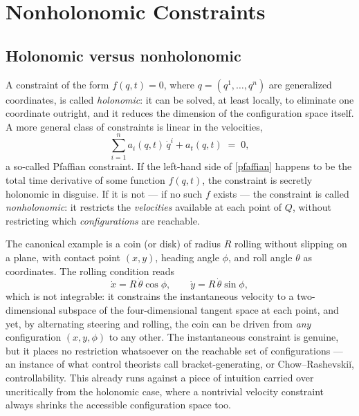 \chapter{Nonholonomic Constraints}
\label{nh}

\section{Holonomic versus nonholonomic}

A constraint of the form $f(q,t)=0$, where $q=(q^1,\dots,q^n)$ are
generalized coordinates, is called \emph{holonomic}: it can be
solved, at least locally, to eliminate one coordinate outright, and
it reduces the dimension of the configuration space itself. A more
general class of constraints is linear in the velocities,
\begin{equation}
  \sum_{i=1}^n a_i(q,t)\,\dot q^i + a_t(q,t) \;=\;0,
  \label{pfaffian}
\end{equation}
a so-called Pfaffian constraint. If the left-hand side of
\eqref{pfaffian} happens to be the total time derivative of some
function $f(q,t)$, the constraint is secretly holonomic in disguise.
If it is not --- if no such $f$ exists --- the constraint is called
\emph{nonholonomic}: it restricts the \emph{velocities} available at
each point of $Q$, without restricting which \emph{configurations}
are reachable.

The canonical example is a coin (or disk) of radius $R$ rolling
without slipping on a plane, with contact point $(x,y)$, heading
angle $\phi$, and roll angle $\theta$ as coordinates. The
rolling condition reads
\begin{equation}
  \dot x = R\,\dot\theta\cos\phi ,\qquad
  \dot y = R\,\dot\theta\sin\phi ,
  \label{eq:rolling-coin}
\end{equation}
which is not integrable: it constrains the instantaneous velocity to
a two-dimensional subspace of the four-dimensional tangent space at
each point, and yet, by alternating steering and rolling, the coin
can be driven from \emph{any} configuration $(x,y,\phi)$ to any
other. The instantaneous constraint is genuine, but it places no
restriction whatsoever on the reachable set of configurations --- an
instance of what control theorists call bracket-generating, or
Chow--Rashevski\u{i}, controllability. This already runs against a
piece of intuition carried over uncritically from the holonomic
case, where a nontrivial velocity constraint always shrinks the
accessible configuration space too.

